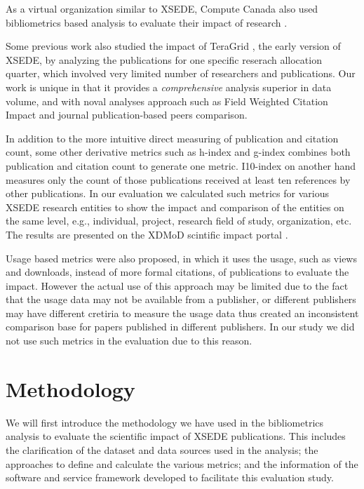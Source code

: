 \documentclass{sig-alternate}
\begin{document}
As a virtual organization similar to XSEDE, Compute Canada also used bibliometrics based analysis
to evaluate their impact of research \cite{www-computecanada}.

Some previous work also studied the impact of TeraGrid \cite {bollen2011and}, the early version
of XSEDE, by analyzing the publications for one specific reserach allocation quarter, which involved
very limited number of researchers and publications. Our work is unique in that it provides
a {\em comprehensive} analysis superior in data volume, and with noval analyses approach such as Field Weighted
Citation Impact and journal publication-based peers comparison.

In addition to the more intuitive direct measuring of publication and citation count, some other
derivative metrics such as h-index \cite{hirsch2005index} and g-index \cite{egghe2006theory} combines
both publication and citation count to generate one metric. I10-index \cite {www-i10index} on another
hand measures only the count of those publications received at least ten references by other publications.
In our evaluation we calculated such metrics for various XSEDE research entities to show the impact and comparison of the entities
on the same level, e.g., individual, project, research field of study, organization, etc. The results
are presented on the XDMoD scintific impact portal \cite{www-xdmod-sciimp}.


Usage based metrics\cite {Bollen:2007:MUM:1255175.1255273,Bollen:2008:TUI:1378889.1378928} were also proposed,
in which it uses the usage, such as views and downloads, instead of more formal citations, of publications
to evaluate the impact. However the actual use of this approach may be limited due to the fact that the usage
data may not be available from a publisher, or different publishers may have different cretiria to measure
the usage data thus created an inconsistent comparison base for papers published in different publishers.
In our study we did not use such metrics in the evaluation due to this reason.

\section{Methodology} \label{S:methodology}

We will first introduce the methodology we have used in the bibliometrics analysis to evaluate the
scientific impact of XSEDE publications. This includes the clarification of the dataset and data sources
used in the analysis; the approaches to define and calculate the various metrics; and the information
of the software and service framework developed to facilitate this evaluation study.
\end{document}

